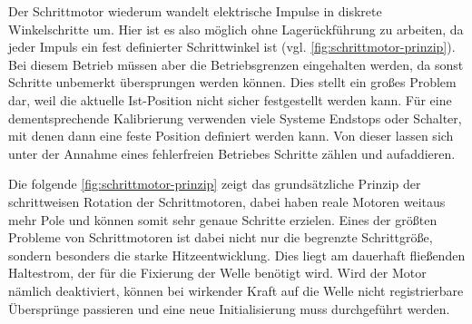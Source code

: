 Der Schrittmotor wiederum wandelt elektrische Impulse in diskrete Winkelschritte um. Hier ist es also möglich ohne Lagerückführung
zu arbeiten, da jeder Impuls ein fest definierter Schrittwinkel ist (vgl. \cref{fig:schrittmotor-prinzip}). Bei diesem Betrieb müssen aber die Betriebsgrenzen eingehalten
werden, da sonst Schritte unbemerkt übersprungen werden können. Dies stellt ein großes Problem dar, weil
die aktuelle Ist-Position nicht sicher festgestellt werden kann. Für eine dementsprechende Kalibrierung verwenden viele Systeme Endstops
oder Schalter, mit denen dann eine feste Position definiert werden kann. Von dieser lassen sich unter der Annahme eines fehlerfreien Betriebes Schritte zählen und aufaddieren.

Die folgende \cref{fig:schrittmotor-prinzip} zeigt das grundsätzliche Prinzip der schrittweisen Rotation der Schrittmotoren, dabei haben reale Motoren weitaus mehr Pole und können somit
sehr genaue Schritte erzielen. Eines der größten Probleme von Schrittmotoren ist dabei nicht nur die begrenzte Schrittgröße, sondern besonders
die starke Hitzeentwicklung. Dies liegt am dauerhaft fließenden Haltestrom, der für die Fixierung der Welle benötigt wird. Wird der Motor nämlich
deaktiviert, können bei wirkender Kraft auf die Welle nicht registrierbare Übersprünge passieren und eine neue Initialisierung muss durchgeführt werden.

